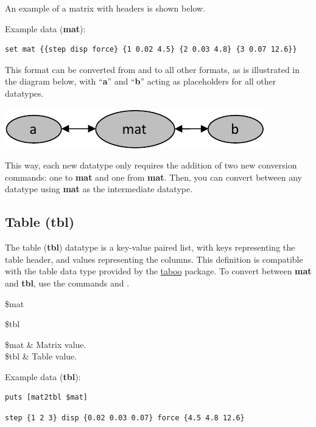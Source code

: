 An example of a matrix with headers is shown below. 
\begin{example}{Example data (\textbf{mat}):}
\begin{lstlisting}
set mat {{step disp force} {1 0.02 4.5} {2 0.03 4.8} {3 0.07 12.6}}
\end{lstlisting}
\end{example}
This format can be converted from and to all other formats, as is illustrated in the diagram below, with ``\textbf{a}'' and ``\textbf{b}'' acting as placeholders for all other datatypes.
\begin{center}
\includegraphics{figures/dataconversion.pdf}
\end{center}
This way, each new datatype only requires the addition of two new conversion commands: one to \textbf{mat} and one from \textbf{mat}.
Then, you can convert between any datatype using \textbf{mat} as the intermediate datatype.
\clearpage
\subsection{Table (tbl)}
The table (\textbf{tbl}) datatype is a key-value paired list, with keys representing the table header, and values representing the columns.
This definition is compatible with the table data type provided by the \textcolor{blue}{\href{https://github.com/ambaker1/taboo}{taboo}} package.
To convert between \textbf{mat} and \textbf{tbl}, use the commands  and .
\begin{syntax}
 \$mat
\end{syntax}
\begin{syntax}
 \$tbl
\end{syntax}
\begin{args}
\$mat & Matrix value. \\
\$tbl & Table value. 
\end{args}
\begin{example}{Example data (\textbf{tbl}):}
\begin{lstlisting}
puts [mat2tbl $mat]
\end{lstlisting}
\tcblower
\begin{lstlisting}
step {1 2 3} disp {0.02 0.03 0.07} force {4.5 4.8 12.6}
\end{lstlisting}
\end{example}
\clearpage
